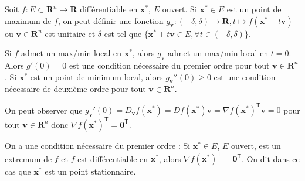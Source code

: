 Soit $f:E\subset \mathbf{R}^{n}\to \mathbf{R}$ différentiable en $\boldsymbol{x}^{*}$, $E$ ouvert. Si $\boldsymbol{x}^{*}\in E$ est un point de maximum de $f$, on peut définir une fonction $g_{\boldsymbol{v}}:(-\delta,\delta)\to \mathbf{R},t\mapsto f(\boldsymbol{x}^{*}+t\boldsymbol{v})$ ou $\boldsymbol{v}\in \mathbf{R}^{n}$ est unitaire et $\delta$ est tel que $\{ \boldsymbol{x}^{*}+t\boldsymbol{v}\in E, \forall t\in(-\delta,\delta) \}$. 
\begin{remark}
Si $f$ admet un max/min local en $\boldsymbol{x}^{*}$, alors $g_{\boldsymbol{v}}$ admet un max/min local en $t=0$. Alors $g'(0)=0$ est une condition nécessaire du premier ordre pour tout $\boldsymbol{v}\in \mathbf{R}^{n}$. Si $\boldsymbol{x}^{*}$ est un point de minimum local, alors $g_{\boldsymbol{v}}''(0)\ge 0$ est une condition nécessaire de deuxième ordre pour tout $\boldsymbol{v}\in \mathbf{R}^{n}$.

On peut observer que $g_{\boldsymbol{v}}'(0)=D_{\boldsymbol{v}}f(\boldsymbol{x}^{*})=Df(\boldsymbol{x}^{*})\boldsymbol{v}=\nabla f(\boldsymbol{x}^{*})^{\mathsf{T}}\boldsymbol{v}=0$ pour tout $\boldsymbol{v}\in \mathbf{R}^{n}$ donc $\nabla f(\boldsymbol{x}^{*})^{\mathsf{T}}=\boldsymbol{0}^{\mathsf{T}}$.
\end{remark}

\begin{definition}
On a une condition nécessaire du premier ordre : Si $\boldsymbol{x}^{*}\in E$, $E$ ouvert, est un extremum de $f$ et $f$ est différentiable en $\boldsymbol{x}^{*}$, alors $\nabla f(\boldsymbol{x}^{*})^{\mathsf{T}}=\boldsymbol{0}^{\mathsf{T}}$. On dit dans ce cas que $\boldsymbol{x}^{*}$ est un point stationnaire.
\end{definition}

